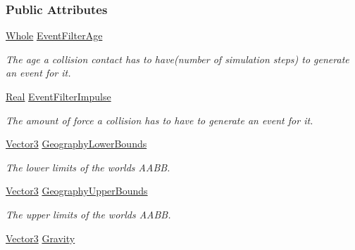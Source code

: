 \subsubsection*{Public Attributes}
\begin{DoxyCompactItemize}
\item 
\hypertarget{classMezzanine_1_1PhysicsConstructionInfo_a5d7cb3eaecb7eb6e11bfbc33a17ad22d}{
\hyperlink{namespaceMezzanine_adcbb6ce6d1eb4379d109e51171e2e493}{Whole} \hyperlink{classMezzanine_1_1PhysicsConstructionInfo_a5d7cb3eaecb7eb6e11bfbc33a17ad22d}{EventFilterAge}}
\label{classMezzanine_1_1PhysicsConstructionInfo_a5d7cb3eaecb7eb6e11bfbc33a17ad22d}

\begin{DoxyCompactList}\small\item\em The age a collision contact has to have(number of simulation steps) to generate an event for it. \item\end{DoxyCompactList}\item 
\hypertarget{classMezzanine_1_1PhysicsConstructionInfo_ae2e1b8cb055139234adb12f15c714078}{
\hyperlink{namespaceMezzanine_a726731b1a7df72bf3583e4a97282c6f6}{Real} \hyperlink{classMezzanine_1_1PhysicsConstructionInfo_ae2e1b8cb055139234adb12f15c714078}{EventFilterImpulse}}
\label{classMezzanine_1_1PhysicsConstructionInfo_ae2e1b8cb055139234adb12f15c714078}

\begin{DoxyCompactList}\small\item\em The amount of force a collision has to have to generate an event for it. \item\end{DoxyCompactList}\item 
\hyperlink{classMezzanine_1_1Vector3}{Vector3} \hyperlink{classMezzanine_1_1PhysicsConstructionInfo_aed6f8f0555fe4dec58758f6d774cbcee}{GeographyLowerBounds}
\begin{DoxyCompactList}\small\item\em The lower limits of the worlds AABB. \item\end{DoxyCompactList}\item 
\hyperlink{classMezzanine_1_1Vector3}{Vector3} \hyperlink{classMezzanine_1_1PhysicsConstructionInfo_aa1794e928aea2ce5f2e9ad4f467b1c14}{GeographyUpperBounds}
\begin{DoxyCompactList}\small\item\em The upper limits of the worlds AABB. \item\end{DoxyCompactList}\item 
\hypertarget{classMezzanine_1_1PhysicsConstructionInfo_ad8811afcf56826a1b2fb90c66da842c5}{
\hyperlink{classMezzanine_1_1Vector3}{Vector3} \hyperlink{classMezzanine_1_1PhysicsConstructionInfo_ad8811afcf56826a1b2fb90c66da842c5}{Gravity}}
\label{classMezzanine_1_1PhysicsConstructionInfo_ad8811afcf56826a1b2fb90c66da842c5}


\end{DoxyCompactItemize}
